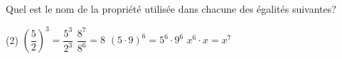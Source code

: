%
%
Quel est le nom de la propriété utilisée dans chacune des égalités suivantes?
	\begin{tasks} (2)
		\task $\left(\dfrac{5}{2}\right)^3=\dfrac{5^3}{2^3}$
		\task $\dfrac{8^7}{8^6}=8$
		\task $(5\cdot 9)^6=5^6\cdot 9^6$
		\task $x^6\cdot x=x^7$
	\end{tasks}
